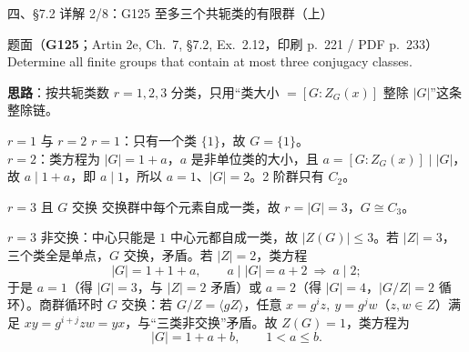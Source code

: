 \documentclass[aspectratio=169,10pt,fontset=none]{ctexbeamer}
\newcommand{\ex}[1]{\textcolor{accent}{\footnotesize\bfseries #1}}
\newcommand{\key}[1]{\textcolor{ink}{\bfseries #1}}
\begin{document}
\begin{frame}[t]{四、\S7.2 详解 2/8：G125 至多三个共轭类的有限群（上）}
\label{ex:G125}
\scriptsize
\begin{block}{\footnotesize 题面（\ex{G125}；Artin 2e, Ch.~7, \S7.2, Ex.~2.12，印刷 p.~221 / PDF p.~233）}
Determine all finite groups that contain at most three conjugacy classes.
\end{block}
\key{思路}：按共轭类数 $r=1,2,3$ 分类，只用“类大小 $=[G:Z_G(x)]$ 整除 $|G|$”这条整除链。
\begin{block}{\footnotesize $r=1$ 与 $r=2$}
$r=1$：只有一个类 $\{1\}$，故 $G=\{1\}$。\\[1pt]
$r=2$：类方程为 $|G|=1+a$，$a$ 是非单位类的大小，且 $a=[G:Z_G(x)]\mid|G|$，故 $a\mid 1+a$，即 $a\mid1$，所以 $a=1$、$|G|=2$。2 阶群只有 $C_2$。
\end{block}
\begin{block}{\footnotesize $r=3$ 且 $G$ 交换}
交换群中每个元素自成一类，故 $r=|G|=3$，$G\cong C_3$。
\end{block}
\begin{block}{\footnotesize $r=3$ 非交换：中心只能是 $1$}
中心元都自成一类，故 $|Z(G)|\le3$。若 $|Z|=3$，三个类全是单点，$G$ 交换，矛盾。若 $|Z|=2$，类方程
\[
|G|=1+1+a,\qquad a\mid|G|=a+2\ \Rightarrow\ a\mid2;
\]
于是 $a=1$（得 $|G|=3$，与 $|Z|=2$ 矛盾）或 $a=2$（得 $|G|=4$，$|G/Z|=2$ 循环）。商群循环时 $G$ 交换：若 $G/Z=\langle gZ\rangle$，任意 $x=g^i z,\ y=g^j w$（$z,w\in Z$）满足 $xy=g^{i+j}zw=yx$，与“三类非交换”矛盾。故 $Z(G)=1$，类方程为
\[
|G|=1+a+b,\qquad 1<a\le b.
\]
\end{block}
\end{frame}
\end{document}
